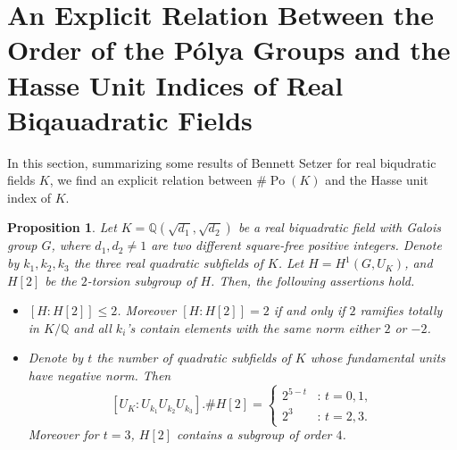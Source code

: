 \documentclass{jams-l}
\newtheorem{proposition}[theorem]{Proposition}
\theoremstyle{definition}
\theoremstyle{remark}
\numberwithin{equation}{section}
\DeclareMathOperator{\Po}{Po}
\DeclareMathOperator{\Gal}{Gal}
\begin{document}
\fi 




\section{An Explicit Relation Between the Order of the P\'olya Groups and the Hasse Unit Indices of Real Biqauadratic Fields} \label{Setzer's results}
In this section, summarizing some results of Bennett Setzer \cite{Bennett} for real biqudratic fields $K$, we find an explicit relation between $\# \Po(K)$ and the Hasse unit index of $K$.

\begin{proposition}\label{proposition, Setzer results}\cite{Bennett}
Let $K=\mathbb{Q}(\sqrt{d_1},\sqrt{d_2})$ be a real biquadratic field with Galois group $G$, where $d_1,d_2 \neq 1$ are two different square-free positive integers.
Denote by $k_1,k_2,k_3$ the three real quadratic subfields of $K$. Let  $H=H^1(G,U_K)$, and $H[2]$ be the $2$-torsion subgroup of $H$. Then,
the following assertions hold.
\begin{itemize}
\item[(i)] \cite[Theorem 4]{Bennett} $\left[H:H[2] \right] \leq 2$. Moreover $\left[H:H[2] \right]=2$ if and only if $2$ ramifies totally in $K/\mathbb{Q}$ and all $k_i$'s contain elements with the same norm either $2$ or $-2$.

\item[(ii)]\cite[$\S$ 4,5]{Bennett} Denote by $t$ the number of quadratic subfields of $K$ whose fundamental units have negative norm. Then
\begin{equation*}
  	\left[U_K : U_{k_1} U_{k_2} U_{k_3}\right]. \#H[2]  = \begin{cases}
               2^{5-t}              & : \,  t =0,1, \\ 
              2^{3}            & : \,  t=2,3.
           \end{cases}
\end{equation*}
Moreover for $t=3$, $H[2]$ contains a subgroup of order $4$.


\end{itemize}
\end{proposition}
\end{document}
